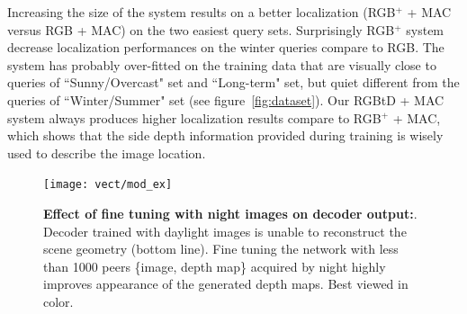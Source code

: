 

Increasing the size of the system results on a better localization (RGB$^{+}$ + MAC versus RGB + MAC) on the two easiest query sets. Surprisingly RGB$^{+}$ system decrease localization performances on the winter queries compare to RGB. The system has probably over-fitted on the training data that are visually close to queries of ``Sunny/Overcast" set and ``Long-term" set, but quiet different from the queries of ``Winter/Summer" set (see figure~\ref{fig:dataset}). Our RGBtD + MAC system always produces higher localization results compare to RGB$^{+}$ + MAC, which shows that the side depth information provided during training is wisely used to describe the image location. 

\begin{figure}
	\center
	\texttt{[image: vect/mod\_ex]}	
	\caption{\label{fig:mod_ex} \textbf{Effect of fine tuning with night images on decoder output:}. Decoder trained with daylight images is unable to reconstruct the scene geometry (bottom line). Fine tuning the network with less than 1000 peers \{image, depth map\} acquired by night highly improves appearance of the generated depth maps. Best viewed in color.}
\end{figure}

